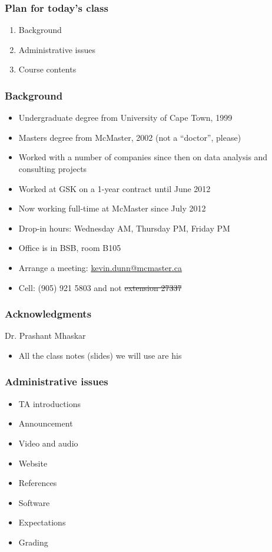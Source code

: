 \begin{frame}\frametitle{Plan for today's class}
	\begin{enumerate}
		\item	Background 
		\item	Administrative issues 
		\item	Course contents 
	\end{enumerate}
\end{frame}

\begin{frame}\frametitle{Background}
	{\color{myGreen}{About myself}}
	\begin{itemize}
		\item	Undergraduate degree from University of Cape Town, 1999
		\item	Masters degree from McMaster, 2002 (not a ``doctor'', please)
		\item	Worked with a number of companies since then on data analysis and consulting projects
		\item	Worked at GSK on a 1-year contract until June 2012
		\item	Now working full-time at McMaster since July 2012
		\item	Drop-in hours: Wednesday AM, Thursday PM, Friday PM
		\item	Office is in BSB, room B105
		\item	Arrange a meeting: \url{kevin.dunn@mcmaster.ca}
		\item	Cell: (905) 921 5803 and not \sout{extension 27337}
	\end{itemize}	
\end{frame}

\begin{frame}\frametitle{Acknowledgments}
	Dr. Prashant Mhaskar
	\begin{itemize}
		\item	All the class notes (slides) we will use are his
	\end{itemize}
\end{frame}

\begin{frame}\frametitle{Administrative issues}
	\begin{itemize}
		\item	TA introductions 
		\item	Announcement 
		\item	Video and audio 
		\item	Website 
		\item	References 
		\item	Software 
		\item	Expectations 
		\item	Grading 
	\end{itemize}
\end{frame}


